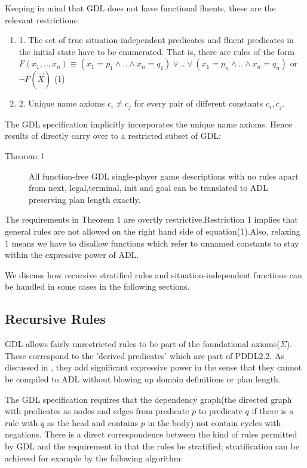\documentclass{article}
\begin{document}
Keeping in mind that GDL does not have functional fluents, these are the relevant restrictions:

\begin{enumerate}
\item 1. The set of true situation-independent predicates and fluent predicates in
the initial state have to be enumerated. That is, there are rules of the form
$F(x_{1},..,x_{n})\equiv (x_{1}=p_{1} \land .. \land x_{n}=q_{1}) \lor .. \lor (x_{1}=p_{n} \land .. \land x_{n}=q_{n})$ or $\neg F(\vec{X})$  (1)
\item 2. Unique name axioms $c_{i}\neq c_{j}$ for every pair of different constants $c_{i},c_{j}$.
\end{enumerate}

The GDL specification implicitly incorporates the unique name axioms. Hence results of \cite{roeger:kr} directly carry over to a restricted subset of GDL:

\begin{description}
\item [{Theorem 1}] All function-free GDL single-player game descriptions with no rules apart from next, legal,terminal, init and goal can be translated to ADL preserving plan length exactly.
\end{description}

The requirements in Theorem  1 are overtly restrictive.Restriction 1 implies that general rules are not allowed on the right hand side of equation(1).Also, relaxing 1 means we have to disallow functions which refer to unnamed constants to stay within the expressive power of ADL\cite{roeger:aaai}. 

We discuss how recursive stratified rules and situation-independent functions can be handled in some cases in the following sections.

\subsection{Recursive Rules}

GDL allows fairly unrestricted rules to be part of the foundational axioms($\Sigma$). These correspond to the 'derived predicates' which are part of PDDL2.2. As discussed in \cite{Thiebaux03indefense:jair}, they add significant expressive power in the sense that they cannot be compiled to ADL without blowing up domain definitions or plan length.

The GDL specification requires that the dependency graph(the directed graph with predicates as nodes and edges from predicate $p$ to predicate $q$ if there is a rule with $q$ as the head and contains $p$ in the body) not contain cycles with negations. There is a direct correspondence between the kind of rules permitted by GDL and the requirement in \cite{Thiebaux03indefense:jair} that the rules be stratified; stratification can be achieved for example by the following algorithm:
\end{document}
